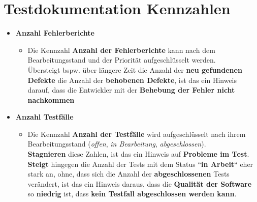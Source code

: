 \section{Testdokumentation Kennzahlen}


\begin{tcolorbox}[title=Kennzahlen der Tesdokumentation]

    \begin{itemize}
        \item \textbf{Anzahl Fehlerberichte}
        \begin{itemize}
            \item Die Kennzahl \textbf{Anzahl der Fehlerberichte} kann nach dem Bearbeitungsstand und der Priorität aufgeschlüsselt werden.\\
            Übersteigt bspw. über längere Zeit die Anzahl der \textbf{neu gefundenen Defekte} die Anzahl der \textbf{behobenen Defekte}, ist das ein Hinweis darauf, dass die Entwickler mit der \textbf{Behebung der Fehler nicht nachkommen}
        \end{itemize}
        \item \textbf{Anzahl Testfälle}
        \begin{itemize}
            \item Die Kennzahl \textbf{Anzahl der Testfälle} wird aufgeschlüsselt nach ihrem Bearbeitungsstand (\textit{offen}, \textit{in Bearbeitung}, \textit{abgeschlossen}).\\
            \textbf{Stagnieren} diese Zahlen, ist das ein Hinweis auf \textbf{Probleme im Test}.\\
            \textbf{Steigt} hingegen die Anzahl der Tests mit dem Status ``\textbf{in Arbeit}`` eher stark an, ohne, dass sich die Anzahl der \textbf{abgeschlossenen} Tests verändert, ist das ein Hinweis daraus, dass die \textbf{Qualität der Software} so \textbf{niedrig} ist, dass \textbf{kein Testfall abgeschlossen werden kann}.
        \end{itemize}
    \end{itemize}

\end{tcolorbox}